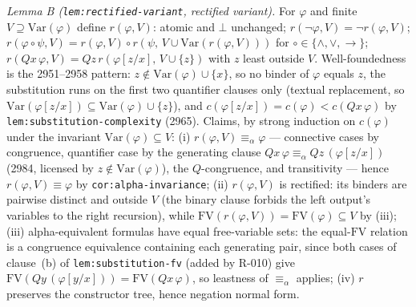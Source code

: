 \emph{Lemma B (\texttt{lem:rectified-variant}, rectified variant).}  For
\(\varphi\) and finite \(V\supseteq\mathrm{Var}(\varphi)\) define
\(r(\varphi,V)\): atomic and \(\bot\) unchanged; \(r(\neg\varphi,V)=\neg
r(\varphi,V)\); \(r(\varphi\circ\psi,V)=r(\varphi,V)\circ r(\psi,\,V\cup
\mathrm{Var}(r(\varphi,V)))\) for \(\circ\in\{\wedge,\vee,\to\}\);
\(r(Qx\,\varphi,V)=Qz\,r(\varphi[z/x],\,V\cup\{z\})\) with \(z\) least outside
\(V\).  Well-foundedness is the 2951--2958 pattern:
\(z\notin\mathrm{Var}(\varphi)\cup\{x\}\), so no binder of \(\varphi\) equals
\(z\), the substitution runs on the first two quantifier clauses only (textual
replacement, so
\(\mathrm{Var}(\varphi[z/x])\subseteq\mathrm{Var}(\varphi)\cup\{z\}\)), and
\(c(\varphi[z/x])=c(\varphi)<c(Qx\,\varphi)\) by
\texttt{lem:substitution-complexity} (2965).  Claims, by strong induction on
\(c(\varphi)\) under the invariant \(\mathrm{Var}(\varphi)\subseteq V\):
(i) \(r(\varphi,V)\equiv_{\alpha}\varphi\) --- connective cases by congruence,
quantifier case by the generating clause \(Qx\,\varphi\equiv_\alpha
Qz\,(\varphi[z/x])\) (2984, licensed by \(z\notin\mathrm{Var}(\varphi)\)), the
\(Q\)-congruence, and transitivity --- hence \(r(\varphi,V)\equiv\varphi\) by
\texttt{cor:alpha-invariance}; (ii) \(r(\varphi,V)\) is rectified: its binders
are pairwise distinct and outside \(V\) (the binary clause forbids the left
output's variables to the right recursion), while
\(\mathrm{FV}(r(\varphi,V))=\mathrm{FV}(\varphi)\subseteq V\) by (iii);
(iii) alpha-equivalent formulas have equal free-variable sets: the
equal-\(\mathrm{FV}\) relation is a congruence equivalence containing each
generating pair, since both cases of clause~(b) of
\texttt{lem:substitution-fv} (added by R-010) give
\(\mathrm{FV}(Qy\,(\varphi[y/x]))=\mathrm{FV}(Qx\,\varphi)\), so leastness of
\(\equiv_\alpha\) applies; (iv) \(r\) preserves the constructor tree, hence
negation normal form.

